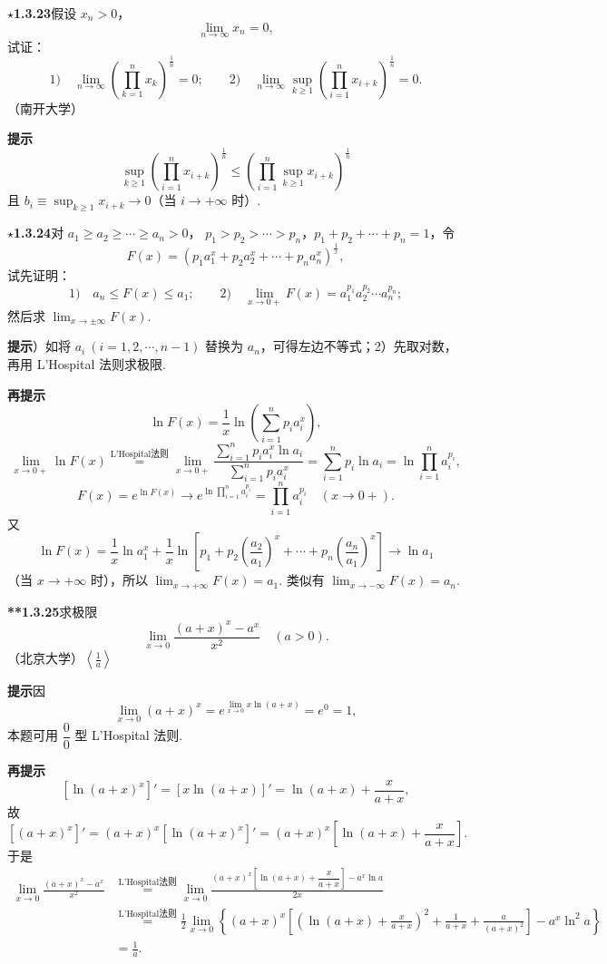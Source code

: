 \documentclass[UTF8,12pt,a4paper,fontset=fandol]{ctexart}
\begin{document}
\noindent\textbf{$\star$1.3.23}\quad 假设 $x_n>0$，
\[
  \lim_{n\to\infty}x_n=0,
\]
试证：
\[
  1)\quad \lim_{n\to\infty}\left(\prod_{k=1}^n x_k\right)^{\frac1n}=0;
  \qquad
  2)\quad \lim_{n\to\infty}\sup_{k\ge1}\left(\prod_{i=1}^n x_{i+k}\right)^{\frac1n}=0.
\]
（南开大学）

\noindent\textbf{提示}\quad
\[
  \sup_{k\ge1}\left(\prod_{i=1}^n x_{i+k}\right)^{\frac1n}
  \le
  \left(\prod_{i=1}^n\sup_{k\ge1}x_{i+k}\right)^{\frac1n}
\]
且 $b_i\equiv\sup_{k\ge1}x_{i+k}\to0$（当 $i\to+\infty$ 时）.

\noindent\textbf{$\star$1.3.24}\quad 对 $a_1\ge a_2\ge\cdots\ge a_n>0$，
$p_1>p_2>\cdots>p_n$，$p_1+p_2+\cdots+p_n=1$，令
\[
  F(x)=\left(p_1a_1^x+p_2a_2^x+\cdots+p_na_n^x\right)^{\frac1x},
\]
试先证明：
\[
  1)\quad a_n\le F(x)\le a_1;\qquad
  2)\quad \lim_{x\to0+}F(x)=a_1^{p_1}a_2^{p_2}\cdots a_n^{p_n};
\]
然后求 $\displaystyle\lim_{x\to\pm\infty}F(x)$.

\noindent\textbf{提示}）如将 $a_i\ (i=1,2,\cdots,n-1)$ 替换为 $a_n$，可得左边不等式；2）先取对数，再用 L'Hospital 法则求极限.

\noindent\textbf{再提示}\quad
\[
  \ln F(x)=\frac1x\ln\left(\sum_{i=1}^np_ia_i^x\right),
\]
\[
  \lim_{x\to0+}\ln F(x)
  \overset{\text{L'Hospital法则}}{=}
  \lim_{x\to0+}\frac{\sum_{i=1}^np_ia_i^x\ln a_i}{\sum_{i=1}^np_ia_i^x}
  =\sum_{i=1}^np_i\ln a_i=\ln\prod_{i=1}^na_i^{p_i},
\]
\[
  F(x)=e^{\ln F(x)}\to e^{\ln\prod_{i=1}^na_i^{p_i}}
  =\prod_{i=1}^na_i^{p_i}\quad(x\to0+).
\]
又
\[
  \ln F(x)=\frac1x\ln a_1^x+\frac1x
  \ln\left[p_1+p_2\left(\frac{a_2}{a_1}\right)^x+\cdots+
  p_n\left(\frac{a_n}{a_1}\right)^x\right]\to\ln a_1
\]
（当 $x\to+\infty$ 时），所以 $\displaystyle\lim_{x\to+\infty}F(x)=a_1$.
类似有 $\displaystyle\lim_{x\to-\infty}F(x)=a_n$.

\noindent\textbf{**1.3.25}\quad 求极限
\[
  \lim_{x\to0}\frac{(a+x)^x-a^x}{x^2}\quad(a>0).
\]
（北京大学）\quad $\left\langle\frac1a\right\rangle$

\noindent\textbf{提示}\quad 因
\[
  \lim_{x\to0}(a+x)^x=e^{\lim_{x\to0}x\ln(a+x)}=e^0=1,
\]
本题可用 $\dfrac00$ 型 L'Hospital 法则.

\noindent\textbf{再提示}\quad
\[
  [\ln(a+x)^x]'=[x\ln(a+x)]'=\ln(a+x)+\frac{x}{a+x},
\]
故
\[
  [(a+x)^x]'=(a+x)^x[\ln(a+x)^x]'
  =(a+x)^x\left[\ln(a+x)+\frac{x}{a+x}\right].
\]
于是
\[
\begin{aligned}
  \lim_{x\to0}\frac{(a+x)^x-a^x}{x^2}
  &\overset{\text{L'Hospital法则}}{=}
  \lim_{x\to0}
  \frac{(a+x)^x\left[\ln(a+x)+\dfrac{x}{a+x}\right]-a^x\ln a}{2x}\\
  &\overset{\text{L'Hospital法则}}{=}
  \frac12\lim_{x\to0}\left\{
  (a+x)^x\left[\left(\ln(a+x)+\frac{x}{a+x}\right)^2
  +\frac1{a+x}+\frac a{(a+x)^2}\right]
  -a^x\ln^2a\right\}\\
  &=\frac1a.
\end{aligned}
\]
\end{document}
